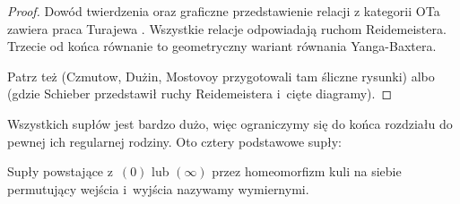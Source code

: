 \begin{proof}
    Dowód twierdzenia oraz graficzne przedstawienie relacji z kategorii OTa zawiera praca Turajewa \cite{turaev1990}.
    Wszystkie relacje odpowiadają ruchom Reidemeistera.
%
    Trzecie od końca równanie to geometryczny wariant równania Yanga-Baxtera.
%

Patrz też \cite[s. 29-30]{duzhin2012} (Czmutow, Dużin, Mostovoy przygotowali tam śliczne rysunki) albo \cite[s. 31]{schieber2018} (gdzie Schieber przedstawił ruchy Reidemeistera i~cięte diagramy).
%
%
%
%
\end{proof}

Wszystkich supłów jest bardzo dużo, więc ograniczymy się do końca rozdziału do pewnej ich regularnej rodziny.
Oto cztery podstawowe supły:
\begin{comment}
\begin{figure}[H]
    \centering
    \begin{minipage}[b]{.23\linewidth}
        \[
            \LargeTangleBasicZero
        \]
        \subcaption{$(0)$}
    \end{minipage}
    \begin{minipage}[b]{.23\linewidth}
        \[
            \LargeTangleBasicInfinity
        \]
        \subcaption{$(\infty) = (0, 0)$}
    \end{minipage}
    \begin{minipage}[b]{.23\linewidth}
        \[
            \LargeTangleBasicMinus
        \]
        \subcaption{$(-1)$}
    \end{minipage}
    \begin{minipage}[b]{.23\linewidth}
        \[
            \LargeTangleBasicPlus
        \]
        \subcaption{$(+1)$}
    \end{minipage}
\end{figure}
\end{comment}

\begin{definition}
    Supły powstające z~$(0)$ lub $(\infty)$ przez homeomorfizm kuli na siebie permutujący wejścia i~wyjścia nazywamy wymiernymi.
\end{definition}

